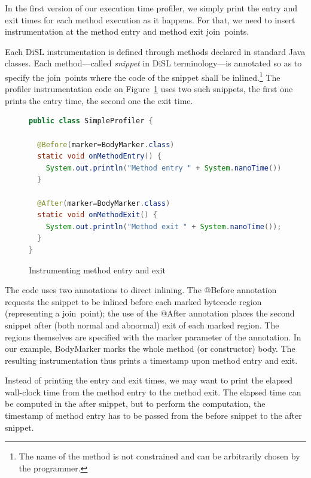 \documentclass{article}
\newcommand{\brcode}[1]{\textsf{#1}}
\newcommand{\code}[1]{\mbox{\brcode{#1}}}
\begin{document}

In the first version of our execution time profiler, we simply print the entry and exit times for each method execution as it happens.
For that, we need to insert instrumentation at the method entry and method exit join~points.

Each DiSL instrumentation is defined through methods declared in standard Java classes.
Each method---called {\em snippet} in DiSL terminology---is annotated so as to specify the join~points where the code of the snippet shall be inlined.\footnote{The name of the method is not constrained and can be arbitrarily chosen by the programmer.}
The profiler instrumentation code on Figure~\ref{fig:instr-prof-simple-prof} uses two such snippets, the first one prints the entry time, the second one the exit time.

\begin{figure}[h!]
\smaller
\begin{lstlisting}[language=Java]
public class SimpleProfiler {

  @Before(marker=BodyMarker.class)
  static void onMethodEntry() {
    System.out.println("Method entry " + System.nanoTime());
  }

  @After(marker=BodyMarker.class)
  static void onMethodExit() {
    System.out.println("Method exit " + System.nanoTime());
  }
}
\end{lstlisting}
\caption{Instrumenting method entry and exit}
\label{fig:instr-prof-simple-prof}
\end{figure}

The code uses two annotations to direct inlining.
The \code{@Before} annotation requests the snippet to be inlined before each marked bytecode region (representing a join~point); the use of the \code{@After} annotation places the second snippet after (both normal and abnormal) exit of each marked region.
The regions themselves are specified with the \code{marker} parameter of the annotation.
In our example, \code{BodyMarker} marks the whole method (or constructor) body.
The resulting instrumentation thus prints a timestamp upon method entry and exit.

\medskip

Instead of printing the entry and exit times, we may want to print the elapsed wall-clock time from the method entry to the method exit.
The elapsed time can be computed in the after snippet, but to perform the computation, the timestamp of method entry has to be passed from the before snippet to the after snippet.
\end{document}
